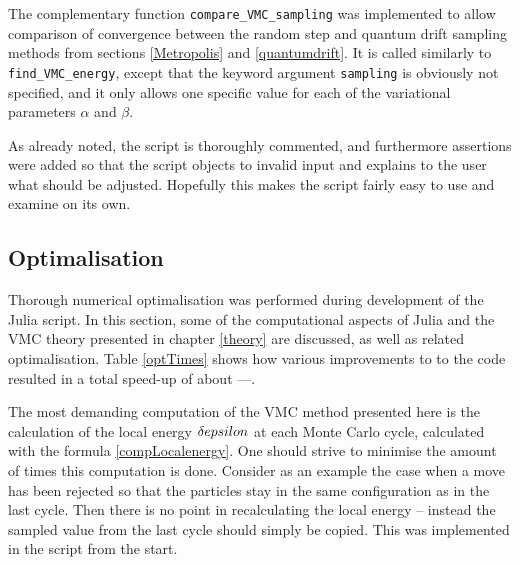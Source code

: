 \documentclass[a4paper,8pt]{article}
\begin{document}
\begin{multicols}{2}
The complementary function \texttt{compare\_VMC\_sampling} was implemented to allow comparison of convergence between the random step and quantum drift sampling methods from sections \ref{Metropolis} and \ref{quantumdrift}. It is called similarly to \texttt{find\_VMC\_energy}, except that the keyword argument \texttt{sampling} is obviously not specified, and it only allows one specific value for each of the variational parameters $\alpha$ and $\beta$.

As already noted, the script is thoroughly commented, and furthermore assertions were added so that the script objects to invalid input and explains to the user what should be adjusted. Hopefully this makes the script fairly easy to use and examine on its own.



\subsection{Optimalisation}\label{optimalisation}
Thorough numerical optimalisation was performed during development of the Julia script. In this section, some of the computational aspects of Julia and the VMC theory presented in chapter \ref{theory} are discussed, as well as related optimalisation. Table \ref{optTimes} shows how various improvements to to the code resulted in a total speed-up of about ---.

The most demanding computation of the VMC method presented here is the calculation of the local energy $\var{epsilon}$ at each Monte Carlo cycle, calculated with the formula \eqref{compLocalenergy}. One should strive to minimise the amount of times this computation is done. Consider as an example the case when a move has been rejected so that the particles stay in the same configuration as in the last cycle. Then there is no point in recalculating the local energy -- instead the sampled value from the last cycle should simply be copied. This was implemented in the script from the start. 


\end{multicols}
\end{document}
